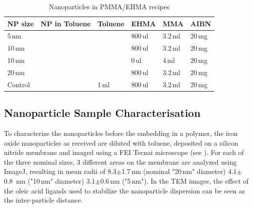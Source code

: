 \begin{table}[tp]
	\centering
	\caption{Nanoparticles in PMMA/EHMA recipes}
	\label{tab:sampleCP}
	\begin{tabular}{llllll}
		\hline
		NP size &NP in Toluene&Toluene & EHMA & MMA & AIBN \\
		\hline
		5\,nm& & &800\,ul&  3.2\,ml&   20\,mg    \\
		10\,nm& & &800\,ul&  3.2\,ml&   20\,mg    \\
		10\,nm& & &0\,ul&  4\,ml&   20\,mg    \\
		20\,nm& & &800\,ul&  3.2\,ml&   20\,mg    \\
			Control& & 1\,ml&800\,ul&  3.2\,ml&   20\,mg    \\
		\hline
	\end{tabular}
\end{table}

\subsection{Nanoparticle Sample Characterisation}
To characterize the nanoparticles before the embedding in a polymer, the iron oxide nanoparticles as received are diluted with toluene, deposited on a silicon nitride membrane and imaged using a FEI Tecnai microscope  (see ).  For each of the three nominal sizes, 3 different areas on the membrane are analyzed using ImageJ, resulting in mean radii of 8.3$\pm$1.7\,nm (nominal "20\,nm" diameter) 4.1$\pm$0.8 \,nm	("10\,nm" diameter) 3.1$\pm$0.6\,nm ("5\,nm"). In the TEM images, the effect of the oleic acid ligands used to stabilize the nanoparticle dispersion can be seen as the inter-particle distance.

